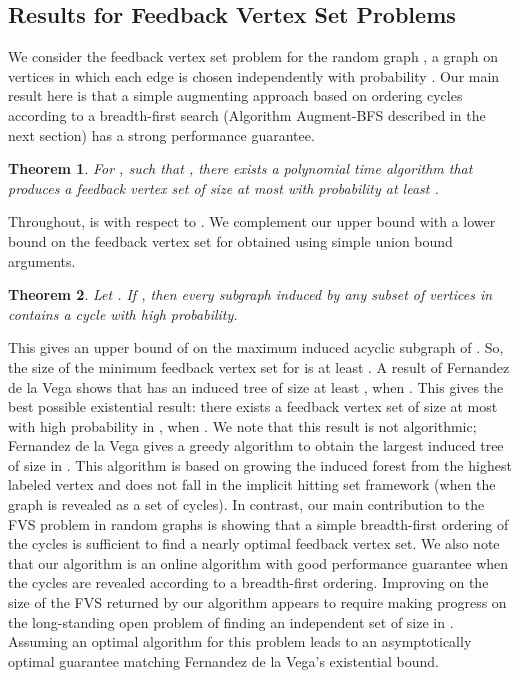 \documentclass[11pt]{article}
\newtheorem{theorem}{Theorem}
\begin{document}
\subsection{Results for Feedback Vertex Set Problems}
We consider the feedback vertex set problem for the random graph , a graph on  vertices in which each edge is chosen independently with probability . Our main result here is that a simple augmenting approach based on ordering cycles according to a breadth-first search (Algorithm Augment-BFS described in the next section) has a strong performance guarantee.

\begin{theorem}\label{theorem:undirected-MFVS}
For , such that , there exists a polynomial time algorithm that produces a feedback vertex set of size at most  with probability at least .
\end{theorem}
Throughout,  is with respect to . We complement our upper bound with a lower bound on the feedback vertex set for  obtained using simple union bound arguments.
\begin{theorem}\label{theorem:undirected-FVSlowerbound}
Let . If , then every subgraph induced by any subset of  vertices in  contains a cycle with high probability.
\end{theorem}

This gives an upper bound of  on the maximum induced acyclic subgraph of . So, the size of the minimum feedback vertex set for  is at least . A result of Fernandez de la Vega \cite{delavega96} shows that  has an induced tree of size at least , when . This gives the best possible existential result: there exists a feedback vertex set of size at most  with high probability in , when . We note that this result is not algorithmic; Fernandez de la Vega gives a greedy algorithm to obtain the largest induced tree of size  in \cite{delavega86}. This algorithm is based on growing the induced forest from the highest labeled vertex and does not fall in the implicit hitting set framework (when the graph is revealed as a set of cycles). In contrast, our main contribution to the FVS problem in random graphs is showing that a simple breadth-first ordering of the cycles is sufficient to find a nearly optimal feedback vertex set. We also note that our algorithm is an online algorithm with good performance guarantee when the cycles are revealed according to a breadth-first ordering. Improving on the size of the FVS returned by our algorithm appears to require making progress on the long-standing open problem of finding an independent set of size  in . Assuming an optimal algorithm for this problem leads to an asymptotically optimal guarantee matching Fernandez de la Vega's existential bound.
\end{document}
